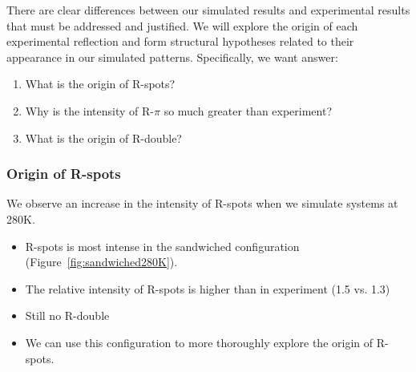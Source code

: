 \documentclass{article}
\begin{document}

  There are clear differences between our simulated results and experimental results
  that must be addressed and justified. We will explore the origin of each experimental 
  reflection and form structural hypotheses related to their appearance in our simulated 
  patterns. Specifically, we want answer:  
  \begin{enumerate}
	\item What is the origin of R-spots?
  	\item Why is the intensity of R-$\pi$ so much greater than experiment?
  	\item What is the origin of R-double?
  \end{enumerate}

  \subsubsection{Origin of R-spots}\label{section:rspots}

  We observe an increase in the intensity of R-spots when we simulate systems at 280K. 
  \begin{itemize}
  		\item R-spots is most intense in the sandwiched configuration
  		(Figure~\ref{fig:sandwiched280K}).
  		\item The relative intensity of R-spots is higher than in experiment (1.5 vs. 1.3) 
  		\item Still no R-double
  		\item We can use this configuration to more thoroughly explore the origin of R-spots.
  \end{itemize}
  
\end{document}
